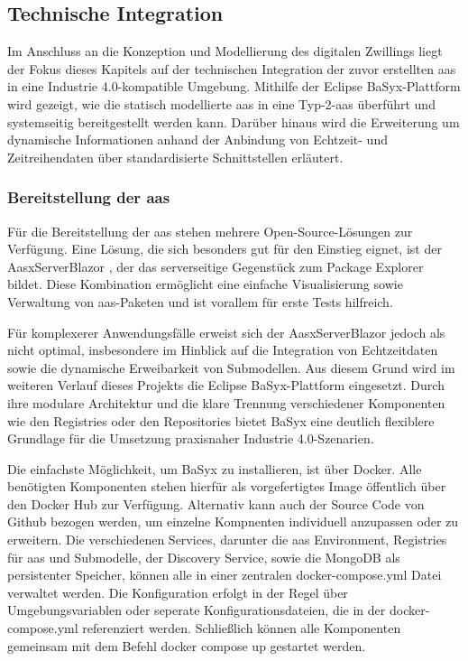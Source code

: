 \subsection{Technische Integration}
Im Anschluss an die Konzeption und Modellierung des digitalen Zwillings liegt der Fokus dieses Kapitels auf der technischen Integration der zuvor erstellten \acs{aas} in eine Industrie 4.0-kompatible Umgebung. 
Mithilfe der Eclipse BaSyx-Plattform wird gezeigt, wie die statisch modellierte \acs{aas} in eine Typ-2-\acs{aas} überführt und systemseitig bereitgestellt werden kann. 
Darüber hinaus wird die Erweiterung um dynamische Informationen anhand der Anbindung von Echtzeit- und Zeitreihendaten über standardisierte Schnittstellen erläutert.

\subsubsection{Bereitstellung der \acs{aas}}
\label{sec:bereitstellungAAS}
Für die Bereitstellung der \acs{aas} stehen mehrere Open-Source-Lösungen zur Verfügung. 
Eine Lösung, die sich besonders gut für den Einstieg eignet, ist der AasxServerBlazor \cite{AASXServer}, der das serverseitige Gegenstück zum Package Explorer bildet. 
Diese Kombination ermöglicht eine einfache Visualisierung sowie Verwaltung von \acs{aas}-Paketen und ist vorallem für erste Tests hilfreich.

Für komplexerer Anwendungsfälle erweist sich der AasxServerBlazor jedoch als nicht optimal, insbesondere im Hinblick auf die Integration von Echtzeitdaten sowie die dynamische Erweibarkeit von Submodellen.
Aus diesem Grund wird im weiteren Verlauf dieses Projekts die Eclipse BaSyx-Plattform eingesetzt.
Durch ihre modulare Architektur und die klare Trennung verschiedener Komponenten wie den Registries oder den Repositories bietet BaSyx eine deutlich flexiblere Grundlage für die Umsetzung praxisnaher Industrie 4.0-Szenarien.

Die einfachste Möglichkeit, um BaSyx zu installieren, ist über Docker.
Alle benötigten Komponenten stehen hierfür als vorgefertigtes Image öffentlich über den Docker Hub zur Verfügung.
Alternativ kann auch der Source Code von Github bezogen werden, um einzelne Kompnenten individuell anzupassen oder zu erweitern.
Die verschiedenen Services, darunter die \acs{aas} Environment, Registries für \acs{aas} und Submodelle, der Discovery Service, sowie die MongoDB als persistenter Speicher, können alle in einer zentralen docker-compose.yml Datei verwaltet werden.
Die Konfiguration erfolgt in der Regel über Umgebungsvariablen oder seperate Konfigurationsdateien, die in der docker-compose.yml referenziert werden.
Schließlich können alle Komponenten gemeinsam mit dem Befehl docker compose up gestartet werden.

